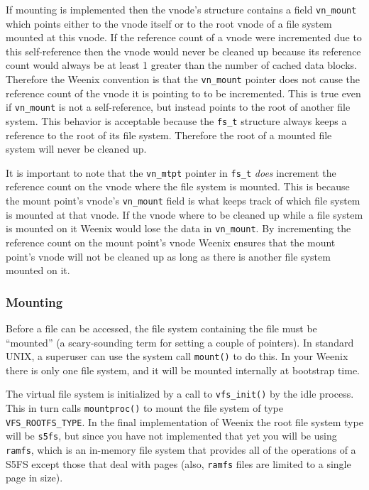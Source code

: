If mounting is implemented then the vnode's structure contains a field \texttt{vn\_mount} which points either to the vnode itself or to the root vnode of a file system mounted at this vnode. If the reference count of a vnode were incremented due to this self-reference then the vnode would never be cleaned up because its reference count would always be at least 1 greater than the number of cached data blocks. Therefore the Weenix convention is that the \texttt{vn\_mount} pointer does not cause the reference count of the vnode it is pointing to to be incremented. This is true even if \texttt{vn\_mount} is not a self-reference, but instead points to the root of another file system. This behavior is acceptable because the \texttt{fs\_t} structure always keeps a reference to the root of its file system. Therefore the root of a mounted file system will never be cleaned up.

It is important to note that the \texttt{vn\_mtpt} pointer in \texttt{fs\_t} \emph{does} increment the reference count on the vnode where the file system is mounted. This is because the mount point's vnode's \texttt{vn\_mount} field is what keeps track of which file system is mounted at that vnode. If the vnode where to be cleaned up while a file system is mounted on it Weenix would lose the data in \texttt{vn\_mount}. By incrementing the reference count on the mount point's vnode Weenix ensures that the mount point's vnode will not be cleaned up as long as there is another file system mounted on it.

\subsubsection{Mounting}

Before a file can be accessed, the file system containing the file must be ``mounted'' (a scary-sounding term for setting a couple of pointers). In standard UNIX, a superuser can use the system call \texttt{mount()} to do this. In your Weenix there is only one file system, and it will be mounted internally at bootstrap time.

The virtual file system is initialized by a call to \texttt{vfs\_init()} by the idle process. This in turn calls \texttt{mountproc()} to mount the file system of type \texttt{VFS\_ROOTFS\_TYPE}. In the final implementation of Weenix the root file system type will be \texttt{s5fs}, but since you have not implemented that yet you will be using \texttt{ramfs}, which is an in-memory file system that provides all of the operations of a S5FS except those that deal with pages (also, \texttt{ramfs} files are limited to a single page in size).

